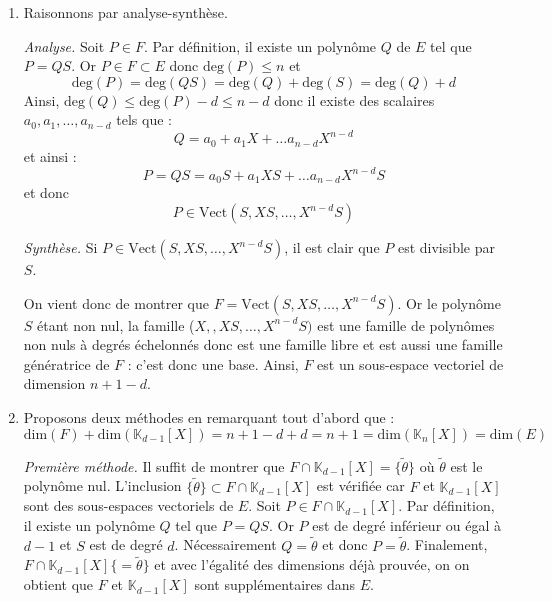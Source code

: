 \documentclass[a4paper,twoside,french,11pt]{VcCours}
\begin{document}
\corr \begin{enumerate}
\item Raisonnons par analyse-synthèse.

\medskip

\textit{Analyse.} Soit $P \in F$. Par définition, il existe un polynôme $Q$ de $E$ tel que $P=QS$. Or $P \in F \subset E$ donc $\textrm{deg}(P) \leq n$ et 
$$ \textrm{deg}(P) = \textrm{deg}(QS) = \textrm{deg}(Q) + \textrm{deg}(S) = \textrm{deg}(Q) + d$$
Ainsi, $\textrm{deg}(Q) \leq \textrm{deg}(P) - d \leq n-d$ donc il existe des scalaires $a_0, a_1, \ldots, a_{n-d}$ tels que :
$$ Q = a_0 + a_1X+ \ldots a_{n-d} X^{n-d}$$
et ainsi :
$$ P = QS = a_0 S + a_1XS+ \ldots a_{n-d} X^{n-d}S$$
et donc 
$$ P \in \textrm{Vect}(S,XS,\ldots, X^{n-d}S)$$

\medskip

\textit{Synthèse.} Si $P \in \textrm{Vect}(S,XS,\ldots, X^{n-d}S)$, il est clair que $P$ est divisible par $S$.

\medskip

On vient donc de montrer que $F= \textrm{Vect}(S,XS,\ldots, X^{n-d}S)$. Or le polynôme $S$ étant non nul, la famille ($X,,XS,\ldots, X^{n-d}S)$ est une famille de polynômes non nuls à degrés échelonnés donc est une famille libre et est aussi une famille génératrice de $F$ : c'est donc une base. Ainsi, $F$ est un sous-espace vectoriel de dimension $n+1-d$.
\item Proposons deux méthodes en remarquant tout d'abord que :
$$ \textrm{dim}(F) + \textrm{dim}(\mathbb{K}_{d-1}[X]) = n+1-d +d = n+1 =  \textrm{dim}(\mathbb{K}_{n}[X]) =  \textrm{dim}(E)$$

\medskip

\textit{Première méthode.}  Il suffit de montrer que $F \cap \mathbb{K}_{d-1}[X] =\lbrace \tilde{\theta} \rbrace$ où $\tilde{\theta}$ est le polynôme nul. L'inclusion  $\lbrace \tilde{\theta} \rbrace \subset F \cap \mathbb{K}_{d-1}[X]$ est vérifiée car $F$ et $\mathbb{K}_{d-1}[X]$ sont des sous-espaces vectoriels de $E$. Soit $P \in F \cap \mathbb{K}_{d-1}[X]$. Par définition, il existe un polynôme $Q$ tel que $P = QS$. Or $P$ est de degré inférieur ou égal à $d-1$ et $S$ est de degré $d$. Nécessairement $Q= \tilde{\theta}$ et donc $P= \tilde{\theta}$. Finalement, $F \cap \mathbb{K}_{d-1}[X] \lbrace = \tilde{\theta} \rbrace$ et avec l'égalité des dimensions déjà prouvée, on on obtient que $F$ et $\mathbb{K}_{d-1}[X]$ sont supplémentaires dans $E$.

\medskip


\end{enumerate}
\end{document}
